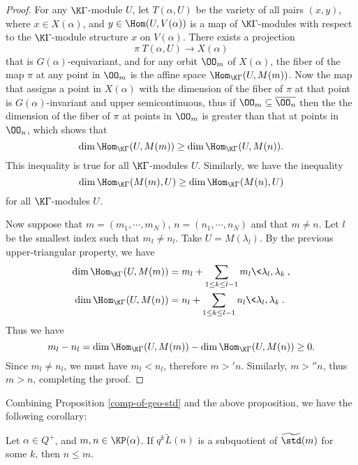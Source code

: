 \begin{proof}
    For any $\K\Gamma$-module $U$, let $T(\alpha,U)$ be the variety
    of all pairs $(x,y)$, where $x\in X(\alpha)$, and $y\in\Hom(U,V(\alpha))$
    is a map of $\K\Gamma$-modules with respect to the $\K\Gamma$-module
    structure $x$ on $V(\alpha)$. There exists a projection 
    \[
        \pi\:T(\alpha,U)\to X(\alpha)
    \] 
    that is $G(\alpha)$-equivariant,
    and for any orbit $\OO_m$ of $X(\alpha)$, the fiber of the map $\pi$
    at any point in $\OO_m$ is the affine space $\Hom_{\K\Gamma}(U,M(m))$.
    Now the map that assigns a point in $X(\alpha)$ with 
    the dimension of the fiber of $\pi$ at that point is $G(\alpha)$-invariant
    and upper semicontinuous, thus if $\OO_m\subseteq\overline{\OO_n}$
    then the the dimension of the fiber of $\pi$ at points in $\OO_m$
    is greater than that at points in $\OO_n$, which shows that 
    \[
        \dim\Hom_{\K\Gamma}(U,M(m))\ge\dim\Hom_{\K\Gamma}(U,M(n)).
    \]
    This inequality is true for all $\K\Gamma$-modules $U$.
    Similarly, we have the inequality
    \[
        \dim\Hom_{\K\Gamma}(M(m),U)\ge\dim\Hom_{\K\Gamma}(M(n),U)
    \]
    for all $\K\Gamma$-modules $U$.

    Now suppose that $m = (m_1,\cdots,m_N)$, $n = (n_1,\cdots,n_N)$ and 
    that $m\ne n$. Let $l$ be the smallest index such that $m_l\ne n_l$.
    Take $U = M(\lambda_l)$. By the previous upper-triangular property, we have
    \[
    \begin{aligned}
        \dim\Hom_{\K\Gamma}(U,M(m))& = m_l+\sum_{1\le k\le l-1}m_l\<\lambda_l,
        \lambda_k\>,\\
        \dim\Hom_{\K\Gamma}(U,M(n))& = n_l+\sum_{1\le k\le l-1}n_l\<\lambda_l,
        \lambda_k\>.\\
    \end{aligned}
    \] 
    Thus we have 
    \[
        m_l-n_l = \dim\Hom_{\K\Gamma}(U,M(m))-\dim\Hom_{\K\Gamma}(U,M(n))\ge 0.
    \]    
    Since $m_l\ne n_l$, we must have $m_l<n_l$,
    therefore $m>'n$. Similarly, $m>''n$, thus $m>n$,
    completing the proof.
\end{proof}

Combining Proposition \ref{comp-of-geo-std} and the above proposition,
we have the following corollary:

\begin{corollary}\label{comp-of-geo-std-2}
    Let $\alpha\in Q^+$, and $m,n\in\KP(\alpha)$.
    If $q^k\widetilde{L}(n)$ is a subquotient of 
    $\widetilde{\std}(m)$ for some $k$, then $n\le m$.
\end{corollary}

